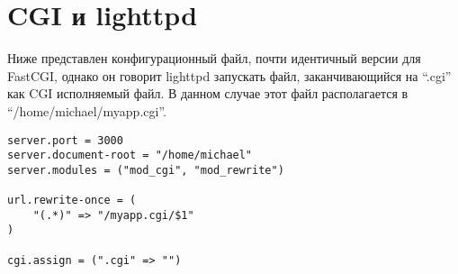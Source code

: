 \section{CGI и lighttpd}
%

Ниже представлен конфигурационный файл, почти идентичный версии для FastCGI, однако он говорит lighttpd запускать файл, заканчивающийся на ``.cgi'' как CGI исполняемый файл. В данном случае этот файл располагается в ``/home/michael/myapp.cgi''.
%
\begin{lstlisting}
server.port = 3000
server.document-root = "/home/michael"
server.modules = ("mod_cgi", "mod_rewrite")

url.rewrite-once = (
    "(.*)" => "/myapp.cgi/$1"
)

cgi.assign = (".cgi" => "")
\end{lstlisting}
